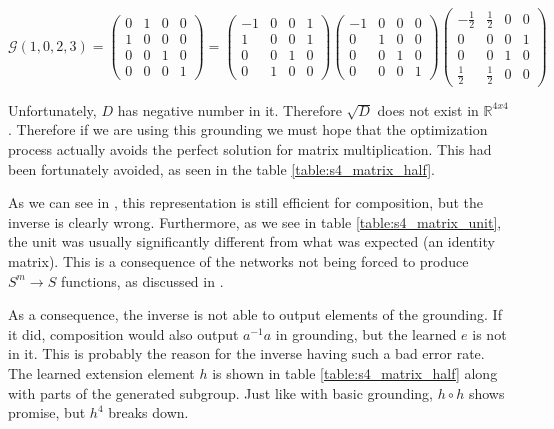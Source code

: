 $$\mathcal{G}(1,0,2,3)=
\left(\begin{matrix}
	0&1&0&0\\
	1&0&0&0\\
	0&0&1&0\\
	0&0&0&1
\end{matrix}\right)
=
\left(\begin{matrix}
	-1&0&0&1\\
	1&0&0&1\\
	0&0&1&0\\
	0&1&0&0
\end{matrix}\right)
\left(\begin{matrix}
	-1&0&0&0\\
	0&1&0&0\\
	0&0&1&0\\
	0&0&0&1
\end{matrix}\right)
\left(\begin{matrix}
	-\frac{1}{2}&\frac{1}{2}&0&0\\
	0&0&0&1\\
	0&0&1&0\\
	\frac{1}{2}&\frac{1}{2}&0&0
\end{matrix}\right)
$$

Unfortunately, $D$ has negative number in it. Therefore $\sqrt{D}$ does not exist in $\mathbb{R}^{4x4}$. Therefore if we are using this grounding we must hope that the optimization process actually avoids the perfect solution for matrix multiplication. This had been fortunately avoided, as seen in the table \ref{table:s4_matrix_half}.

As we can see in , this representation is still  efficient for composition, but the inverse is clearly wrong. Furthermore, as we see in table \ref{table:s4_matrix_unit}, the unit was usually significantly different from what was expected (an identity matrix). This is a consequence of the networks not being forced to produce $S^m\rightarrow S$ functions, as discussed in .

As a consequence, the inverse is not able to output elements of the grounding. If it did, composition would also output $a^{-1}a$ in grounding, but the learned $e$ is not in it. This is probably the reason for the inverse having such a bad error rate.\\

The learned extension element $h$ is shown in table \ref{table:s4_matrix_half} along with parts of the generated subgroup. Just like with basic grounding, $h\circ h$ shows promise, but $h^4$ breaks down.

